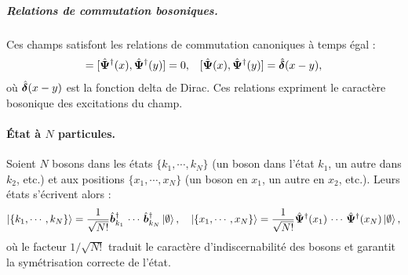 \subparagraph{Relations de commutation bosoniques.}
Ces champs satisfont les relations de commutation canoniques à temps égal :
\begin{eqnarray}
	 [ \operator{\Psi}(x),  \operator{\Psi}(y)  ]   =  [ \operator{\Psi}^\dag(x),  \operator{\Psi}^\dag(y) ]  =  0,   & & [ \operator{\Psi}(x),  \operator{\Psi}^\dagger(y) ]  =  \operator{\delta}(x - y) ,\label{chap:1:com.1}
\end{eqnarray}
où $\hat{\bm{\delta}}(x - y)$ est la fonction delta de Dirac.  
Ces relations expriment le caractère bosonique des excitations du champ.

\paragraph{État à $N$ particules.} Soient $N$ bosons dans les états $\{ k_1 , \cdots , k_N \}$ (un boson dans l’état $k_1$, un autre dans $k_2$, etc.) et aux positions $\{ x_1 , \cdots , x_N \}$ (un boson en $x_1$, un autre en $x_2$, etc.). Leurs états s’écrivent alors :
\begin{eqnarray}
	\ket{ \{ k_1 , \cdots , k_N \}} = \frac{1}{\sqrt{N!}} \hat{\bm{b}}_{k_1}^\dag\, \cdots \, \hat{\bm{b}}_{k_N}^\dag \ket{\emptyset}, \quad \ket{\{x_1 , \cdots , x_N\}} = \frac{1}{\sqrt{N!}} \hat{\bm{\Psi}}^\dag(x_1)\, \cdots \, \hat{\bm{\Psi}}^\dag(x_N) \ket{\emptyset}	, \label{eq.chap.1.ket.N}
\end{eqnarray}
où le facteur \( 1/\sqrt{N!} \) traduit le caractère d’indiscernabilité des bosons et garantit la symétrisation correcte de l’état.

